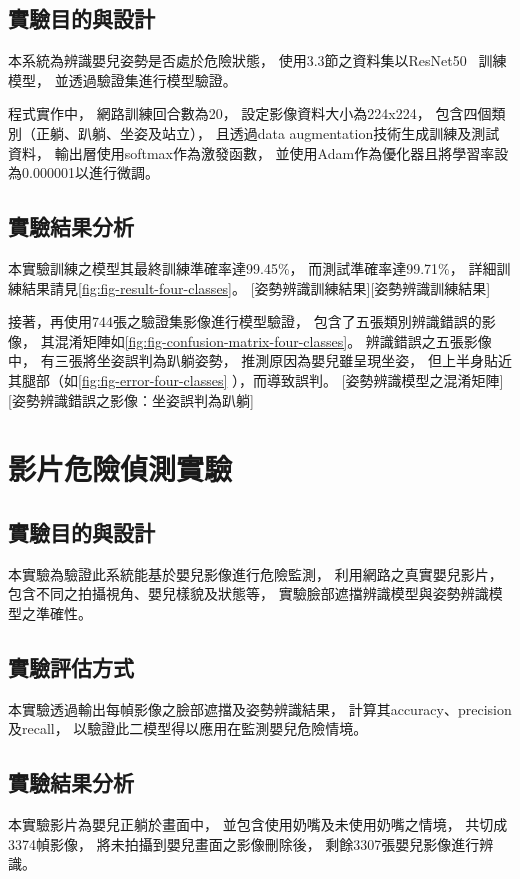 \documentclass[class=NCU_thesis, crop=false]{standalone}
\begin{document}
\subsection{實驗目的與設計}
本系統為辨識嬰兒姿勢是否處於危險狀態，
使用3.3節之資料集以ResNet50~\cite{he_deep_2016}
訓練模型，
並透過驗證集進行模型驗證。

程式實作中，
網路訓練回合數為20，
設定影像資料大小為224x224，
包含四個類別（正躺、趴躺、坐姿及站立），
且透過data augmentation技術生成訓練及測試資料，
輸出層使用softmax作為激發函數，
並使用Adam作為優化器且將學習率設為0.000001以進行微調。

\subsection{實驗結果分析}
本實驗訓練之模型其最終訓練準確率達99.45\%，
而測試準確率達99.71\%，
詳細訓練結果請見\cref{fig:fig-result-four-classes}。
[姿勢辨識訓練結果][姿勢辨識訓練結果]

接著，再使用744張之驗證集影像進行模型驗證，
包含了五張類別辨識錯誤的影像，
其混淆矩陣如\cref{fig:fig-confusion-matrix-four-classes}。
辨識錯誤之五張影像中，
有三張將坐姿誤判為趴躺姿勢，
推測原因為嬰兒雖呈現坐姿，
但上半身貼近其腿部（如\cref{fig:fig-error-four-classes}
），而導致誤判。
[姿勢辨識模型之混淆矩陣]
[姿勢辨識錯誤之影像：坐姿誤判為趴躺]

\section{影片危險偵測實驗}
\subsection{實驗目的與設計}
本實驗為驗證此系統能基於嬰兒影像進行危險監測，
利用網路之真實嬰兒影片，
包含不同之拍攝視角、嬰兒樣貌及狀態等，
實驗臉部遮擋辨識模型與姿勢辨識模型之準確性。

\subsection{實驗評估方式}
本實驗透過輸出每幀影像之臉部遮擋及姿勢辨識結果，
計算其accuracy、precision及recall，
以驗證此二模型得以應用在監測嬰兒危險情境。

\subsection{實驗結果分析}
本實驗影片為嬰兒正躺於畫面中，
並包含使用奶嘴及未使用奶嘴之情境，
共切成3374幀影像，
將未拍攝到嬰兒畫面之影像刪除後，
剩餘3307張嬰兒影像進行辨識。
\end{document}
